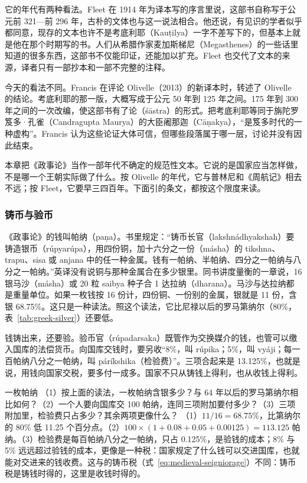 它的年代有两种看法。Fleet 在 1914 年为译本写的序言里说，这部书自称写于公元前 321—前 296 年，古朴的文体也与这一说法相合。他还说，有见识的学者似乎都同意，现存的文本也许不是考底利耶（Kauṭilya）一字不差写下的，但基本上就是他在那个时期写的书。人们从希腊作家麦加斯梯尼（Megasthenes）的一些话里知道的很多东西，这部书不仅能印证，还能加以扩充\cite{fleet1914}。Fleet 也交代了文本的来源，译者只有一部抄本和一部不完整的注释\cite{fleet1914}。

今天的看法不同。Francis 在评论 Olivelle（2013）的新译本时，转述了 Olivelle 的结论。考底利耶的那一版，大概写成于公元 50 年到 125 年之间。175 年到 300 年之间的一次改编，使这部书有了论（śāstra）的形式。把考底利耶等同于旃陀罗笈多·孔雀（Candragupta Maurya）的大臣阇那迦（Cāṇakya），“是笈多时代的一种虚构”。Francis 认为这些论证大体可信，但哪些段落属于哪一层，讨论并没有因此结束\cite{francis2013}。

本章把《政事论》当作一部年代不确定的规范性文本。它说的是国家应当怎样做，不是哪一个王朝实际做了什么。按 Olivelle 的年代，它与普林尼和《周航记》相去不远；按 Fleet，它要早三四百年。下面引的条文，都按这个限度来读。

\subsubsection{铸币与验币}
《政事论》的钱叫帕纳（paṇa）。书里规定：“铸币长官（lakshnádhyakshah）要铸造银币（rúpyarúpa），用四份铜，加十六分之一份（másha）的 tikshna、trapu、sisa 或 anjana 中的任一种金属。钱有一帕纳、半帕纳、四分之一帕纳与八分之一帕纳。”\cite{arthashastra}英译没有说铜与那种金属合在多少银里。同书讲度量衡的一章说，16 银马沙（másha）或 20 粒 saibya 种子合 1 达拉纳（dharana）\cite{arthashastra}。马沙与达拉纳都是重量单位。如果一枚钱按 16 份计，四份铜、一份别的金属，银就是 11 份，含银 68.75\%。这只是一种读法。照这个读法，它比尼禄以后的罗马第纳尔（80\%，表~\ref{tab:greek-silver}）还要低。

钱铸出来，还要验。验币官（rúpadarsaka）既管作为交换媒介的钱，也管可以缴入国库的法偿货币。向国库交钱时，要另收“8\%，叫 rúpika；5\%，叫 vyáji；每一百帕纳八分之一帕纳，叫 páríkshika（检验费）”\cite{arthashastra}。三项合起来是 13.125\%，也就是说，用钱向国家交税，要多付一成多。国家不只从铸钱上得利，也从收钱上得利。

\begin{example}{一枚帕纳}\label{ex:india-mint}
（1）按上面的读法，一枚帕纳含银多少？与 64 年以后的罗马第纳尔相比如何？（2）一个人要向国库交 100 帕纳，连同三项附加要付多少？（3）三项附加里，检验费只占多少？其余两项更像什么？
\solution （1）$11/16=68.75\%$，比第纳尔的 80\% 低 11.25 个百分点。（2）$100\times(1+0.08+0.05+0.00125)=113.125$ 帕纳。（3）检验费是每百帕纳八分之一帕纳，只占 0.125\%，是验钱的成本；8\% 与 5\% 远远超过验钱的成本，更像是一种税：国家规定了什么钱可以交进国库，也就能对交进来的钱收费。这与的铸币税（式~\eqref{eq:medieval-seigniorage}）不同：铸币税是铸钱时得的，这里是收钱时得的。
\end{example}

